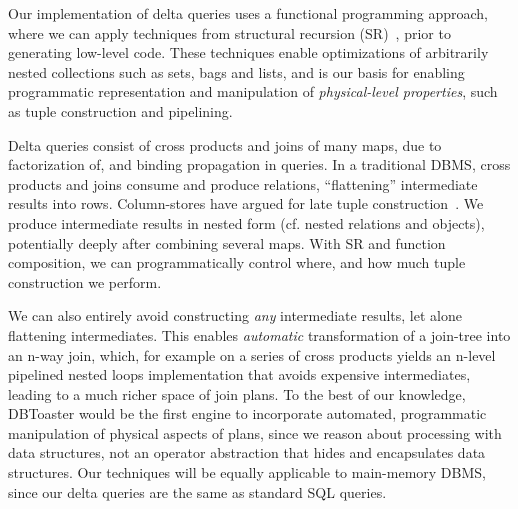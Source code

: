 Our implementation of delta queries uses a functional programming approach,
where we can apply techniques from structural
recursion (SR)~\cite{buneman-kleisli:95}, prior to generating low-level code.
These techniques enable optimizations of arbitrarily nested collections
such as sets, bags and lists, and is our basis for enabling programmatic
representation and manipulation of \textit{physical-level properties}, such
as tuple construction and pipelining.

Delta queries consist of cross products and joins of many maps, due to
factorization of, and binding propagation in queries. In a traditional DBMS,
cross products and joins consume and produce relations, ``flattening''
intermediate results into rows. Column-stores have argued for late tuple
construction~\cite{abadi-icde:07}. We produce intermediate results in nested
form (cf. nested relations and objects), potentially deeply after combining
several maps. With SR and function composition, we can programmatically control
where, and how much tuple construction we perform.

We can also entirely avoid constructing \textit{any} intermediate results, let
alone flattening intermediates. This enables \textit{automatic} transformation
of a join-tree into an n-way join, which, for example on a series of cross
products yields an n-level pipelined nested loops implementation that avoids
expensive intermediates, leading to a much richer space of join plans. To the
best of our knowledge, DBToaster would be the first engine to incorporate
automated, programmatic manipulation of physical aspects of plans, since we
reason about processing with data structures, not an operator abstraction that
hides and encapsulates data structures. Our techniques will be equally
applicable to main-memory DBMS, since our delta queries are the same as standard
SQL queries.




